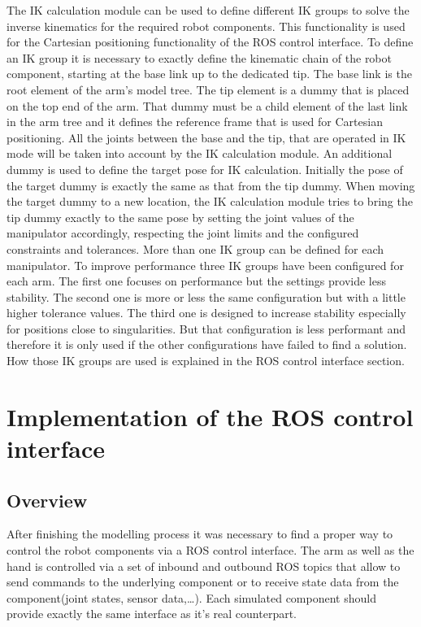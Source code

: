 The IK calculation module can be used to define different IK groups to solve the inverse kinematics for the required robot components. This functionality is used for the Cartesian positioning 
functionality of the ROS control interface. To define an IK group it is necessary to exactly define the kinematic chain of the robot component, starting at the base link up to the dedicated tip. The base link is the root element of the arm's model tree. The tip element is a dummy that is placed on the top end of the arm. That dummy must be a child element of the last link in the arm tree and it defines the reference frame that is used for Cartesian positioning. All the joints between the base and the tip, that are operated in IK mode will be taken into account by the IK calculation module. An additional dummy is used to define the target pose for IK calculation. Initially the pose of the target dummy is exactly the same as that from the tip dummy. When moving the target dummy to a new location, the IK calculation module tries to bring the tip dummy exactly to the same pose by setting the joint values of the manipulator accordingly, respecting the joint limits and the configured constraints and tolerances. More than one IK group can be defined for each manipulator. To improve performance three IK groups have been configured for each arm. The first one focuses on performance but the settings provide less stability. The second one is more or less the same configuration but with a little higher tolerance values. The third one is designed to increase stability especially for positions close to singularities. But that configuration is less performant and therefore it is only used if the other configurations have failed to find a solution. How those IK groups are used is explained in the ROS control interface section.

\section{Implementation of the ROS control interface}

\subsection{Overview}

After finishing the modelling process it was necessary to find a proper way to control the robot components via a ROS control interface. The arm as well as the hand is controlled via a set of inbound and outbound ROS topics that allow to send commands to the underlying component or to receive state data from the component(joint states, sensor data,\ldots). Each simulated component should provide exactly the same interface as it's real counterpart.

